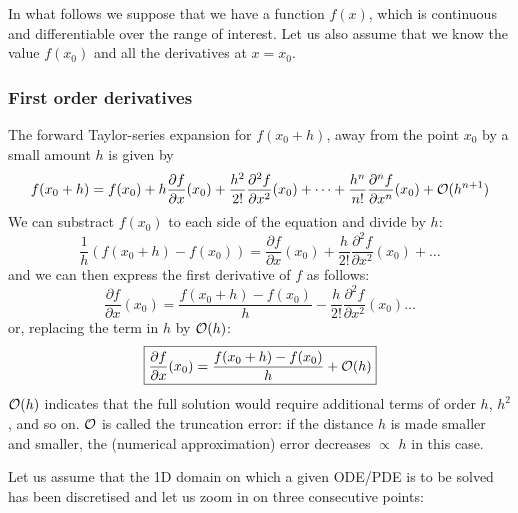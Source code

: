 In what follows we suppose that we have a function $f(x)$, 
which is continuous and differentiable over the range of interest. 
Let us also assume that we know the value $f(x_0)$ and all the derivatives at $x = x_0$. 

\subsubsection{First order derivatives}

The forward Taylor-series expansion for $f(x_0 + h)$, away 
from the point $x_0$ by a small amount $h$ is given by
\begin{equation}
f(x_0+h)=f(x_0)+ 
h \frac{\partial f}{\partial x}(x_0)  + 
\frac{h^2}{2!} \frac{\partial^2 f}{\partial x^2}(x_0)  +
\dots  +
\frac{h^n}{n!} \frac{\partial^n f}{\partial x^n}(x_0)  
+ {\cal O}(h^{n+1})
\end{equation}
We can substract $f(x_0)$ to each side of the equation and divide by $h$:
\begin{equation}
\frac{1}{h} \left(f(x_0+h)-f(x_0)\right) = 
 \frac{\partial f}{\partial x}(x_0)  + 
\frac{h}{2!} \frac{\partial^2 f}{\partial x^2}(x_0)  + \dots 
\end{equation}
and we can then express the first derivative of $f$ as follows:
\begin{equation}
\frac{\partial f}{\partial x}(x_0) = \frac{f(x_0+h)-f(x_0)}{h} - 
\frac{h}{2!} \frac{\partial^2 f}{\partial x^2}(x_0)  \dots
\end{equation}
or, replacing the term in $h$ by ${\cal O}(h)$:
\begin{equation}
\boxed{
\frac{\partial f}{\partial x}(x_0) = \frac{f(x_0+h)-f(x_0)}{h} + {\cal O}(h)
}
\end{equation}
${\cal O}(h)$ indicates that the full solution would require additional terms of order $h$, $h^2$, 
and so on. ${\cal O}$ is called the {\color{olive}truncation error}: if the distance $h$ 
is made smaller and smaller, the (numerical approximation) error decreases $\propto$ $h$ in this case.


Let us assume that the 1D domain on which a given ODE/PDE is to be solved has been discretised
and let us zoom in on three consecutive points:

\begin{center}

\end{center}

